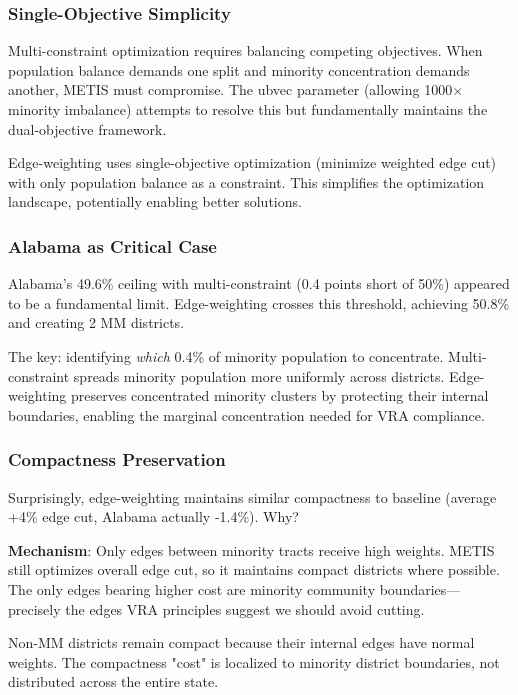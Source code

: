 \subsubsection{Single-Objective Simplicity}

Multi-constraint optimization requires balancing competing objectives. When population balance demands one split and minority concentration demands another, METIS must compromise. The ubvec parameter (allowing 1000$\times$ minority imbalance) attempts to resolve this but fundamentally maintains the dual-objective framework.

Edge-weighting uses single-objective optimization (minimize weighted edge cut) with only population balance as a constraint. This simplifies the optimization landscape, potentially enabling better solutions.

\subsubsection{Alabama as Critical Case}

Alabama's 49.6\% ceiling with multi-constraint (0.4 points short of 50\%) appeared to be a fundamental limit. Edge-weighting crosses this threshold, achieving 50.8\% and creating 2 MM districts.

The key: identifying \textit{which} 0.4\% of minority population to concentrate. Multi-constraint spreads minority population more uniformly across districts. Edge-weighting preserves concentrated minority clusters by protecting their internal boundaries, enabling the marginal concentration needed for VRA compliance.

\subsubsection{Compactness Preservation}

Surprisingly, edge-weighting maintains similar compactness to baseline (average +4\% edge cut, Alabama actually -1.4\%). Why?

\textbf{Mechanism}: Only edges between minority tracts receive high weights. METIS still optimizes overall edge cut, so it maintains compact districts where possible. The only edges bearing higher cost are minority community boundaries—precisely the edges VRA principles suggest we should avoid cutting.

Non-MM districts remain compact because their internal edges have normal weights. The compactness "cost" is localized to minority district boundaries, not distributed across the entire state.

